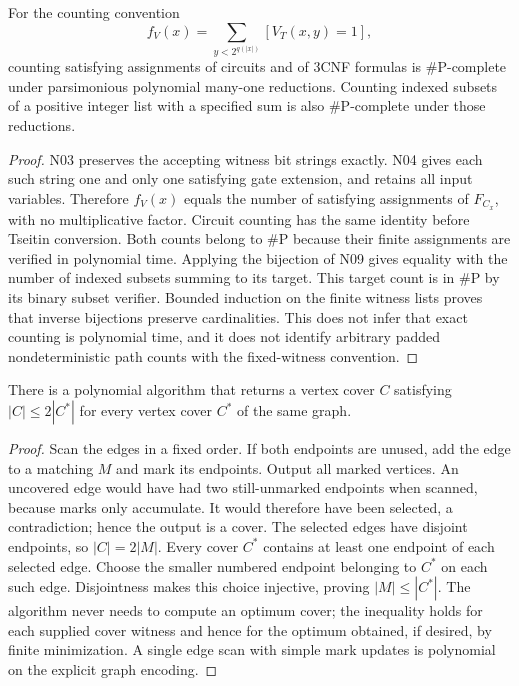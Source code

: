 \begin{theorem}\label{thm:N18}
For the counting convention
\[
 f_V(x)=\sum_{y<2^{q(|x|)}} [V_T(x,y)=1],
\]
counting satisfying assignments of circuits and of 3CNF formulas is
\#$\mathrm P$-complete under parsimonious polynomial many-one reductions.
Counting indexed subsets of a positive integer list with a specified sum is
also \#$\mathrm P$-complete under those reductions.
\end{theorem}
\begin{proof}
N03 preserves the accepting witness bit strings exactly. N04 gives each such
string one and only one satisfying gate extension, and retains all input
variables. Therefore $f_V(x)$ equals the number of satisfying assignments of
$F_{C_x}$, with no multiplicative factor. Circuit counting has the same
identity before Tseitin conversion. Both counts belong to \#$\mathrm P$
because their finite assignments are verified in polynomial time. Applying
the bijection of N09 gives equality with the number of indexed subsets
summing to its target. This target count is in \#$\mathrm P$ by its binary
subset verifier. Bounded induction on the finite witness lists proves that
inverse bijections preserve cardinalities. This does not infer that exact
counting is polynomial time, and it does not identify arbitrary padded
nondeterministic path counts with the fixed-witness convention.
\end{proof}

\begin{theorem}\label{thm:N19}
There is a polynomial algorithm that returns a vertex cover $C$ satisfying
$|C|\le2|C^*|$ for every vertex cover $C^*$ of the same graph.
\end{theorem}
\begin{proof}
Scan the edges in a fixed order. If both endpoints are unused, add the edge
to a matching $M$ and mark its endpoints. Output all marked vertices. An
uncovered edge would have had two still-unmarked endpoints when scanned,
because marks only accumulate. It would therefore have been selected, a
contradiction; hence the output is a cover. The selected edges have disjoint
endpoints, so $|C|=2|M|$. Every cover $C^*$ contains at least one endpoint of
each selected edge. Choose the smaller numbered endpoint belonging to $C^*$
on each such edge. Disjointness makes this choice injective, proving
$|M|\le|C^*|$. The algorithm never needs to compute an optimum cover; the
inequality holds for each supplied cover witness and hence for the optimum
obtained, if desired, by finite minimization. A single edge scan with simple
mark updates is polynomial on the explicit graph encoding.
\end{proof}

